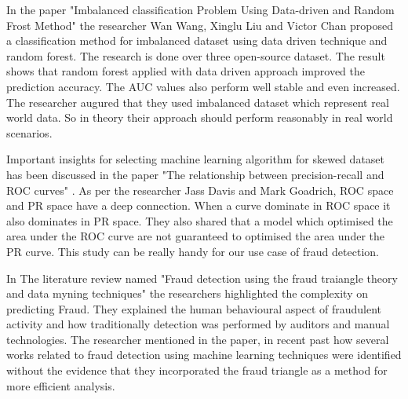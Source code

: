 In the paper "Imbalanced classification Problem Using Data-driven and Random Frost Method" \cite{10.1145/3414274.3414278} the researcher Wan Wang, Xinglu Liu and Victor Chan proposed a classification method for imbalanced dataset using data driven technique and random forest. The research is done over three open-source dataset. The result shows that random forest applied with data driven approach improved the prediction accuracy. The AUC values also perform well stable and even increased. The researcher augured that they used imbalanced dataset which represent real world data. So in theory their approach should perform reasonably in real world scenarios. 

Important insights for selecting machine learning algorithm for skewed dataset has been discussed in the paper "The relationship between precision-recall and ROC curves" \cite{davis06}. As per the researcher Jass Davis and Mark Goadrich, ROC space and PR space have a deep connection. When a curve dominate in ROC space it also dominates in PR space. They also shared that a model which optimised the area under the ROC curve are not guaranteed to optimised the area under the PR curve. This study can be really handy for our use case of fraud detection. 

In The literature review named "Fraud detection using the fraud traiangle theory and data myning techniques" \cite{computers10100121} the researchers highlighted the complexity on predicting Fraud. They explained the human behavioural aspect of fraudulent activity and how traditionally detection was performed by auditors and manual technologies. The researcher mentioned in the paper, in recent past how several works related to fraud detection using
machine learning techniques were identified without the evidence that they incorporated the fraud triangle as a method for more efficient analysis.